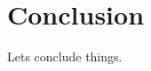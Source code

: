 \documentclass[../masters.tex]{subfiles}
\begin{document}
\graphicspath{{./imgs/}{../imgs/}} %

\section{Conclusion}
Lets conclude things.


%
%
\end{document}
